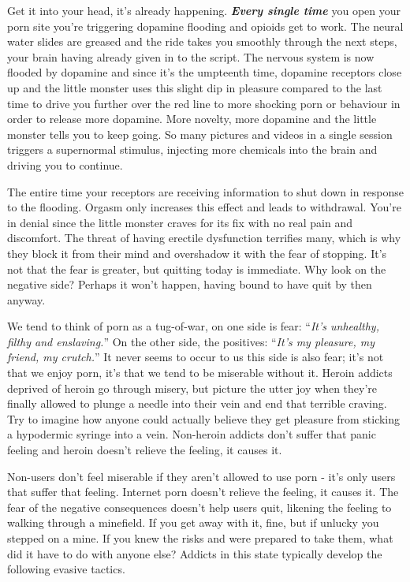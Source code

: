 \documentclass[
]{book}
\begin{document}
Get it into your head, it's already happening. \textbf{\emph{Every single time}} you open your porn site you're triggering dopamine flooding and opioids get to work. The neural water slides are greased and the ride takes you smoothly through the next steps, your brain having already given in to the script. The nervous system is now flooded by dopamine and since it's the umpteenth time, dopamine receptors close up and the little monster uses this slight dip in pleasure compared to the last time to drive you further over the red line to more shocking porn or behaviour in order to release more dopamine. More novelty, more dopamine and the little monster tells you to keep going. So many pictures and videos in a single session triggers a supernormal stimulus, injecting more chemicals into the brain and driving you to continue.

The entire time your receptors are receiving information to shut down in response to the flooding. Orgasm only increases this effect and leads to withdrawal. You're in denial since the little monster craves for its fix with no real pain and discomfort. The threat of having erectile dysfunction terrifies many, which is why they block it from their mind and overshadow it with the fear of stopping. It's not that the fear is greater, but quitting today is immediate. Why look on the negative side? Perhaps it won't happen, having bound to have quit by then anyway.

We tend to think of porn as a tug-of-war, on one side is fear: ``\emph{It's unhealthy, filthy and enslaving.}'' On the other side, the positives: ``\emph{It's my pleasure, my friend, my crutch.}'' It never seems to occur to us this side is also fear; it's not that we enjoy porn, it's that we tend to be miserable without it. Heroin addicts deprived of heroin go through misery, but picture the utter joy when they're finally allowed to plunge a needle into their vein and end that terrible craving. Try to imagine how anyone could actually believe they get pleasure from sticking a hypodermic syringe into a vein. Non-heroin addicts don't suffer that panic feeling and heroin doesn't relieve the feeling, it causes it.

Non-users don't feel miserable if they aren't allowed to use porn - it's only users that suffer that feeling. Internet porn doesn't relieve the feeling, it causes it. The fear of the negative consequences doesn't help users quit, likening the feeling to walking through a minefield. If you get away with it, fine, but if unlucky you stepped on a mine. If you knew the risks and were prepared to take them, what did it have to do with anyone else? Addicts in this state typically develop the following evasive tactics.
\end{document}
